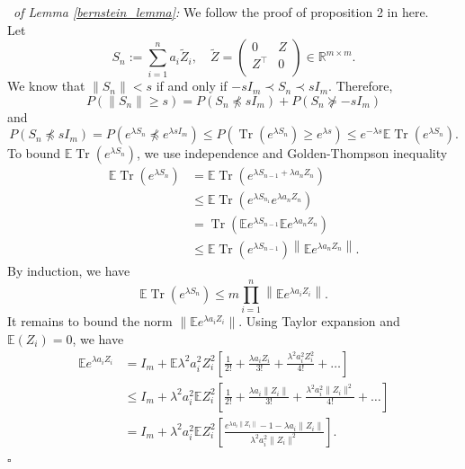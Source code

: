 \documentclass[12pt]{article}
\def\Tr{\operatorname{Tr}}
\newenvironment{pf}{{\noindent\it Proof}\ }{\hfill $\square$\par}
\begin{document}
\begin{pf}{\it of Lemma \ref{bernstein_lemma}:}
  We follow the proof of proposition 2 in \cite{koltchinskii2011neumann} here.\\
  Let 
  $$S_n := \sum_{i=1}^n a_i\widetilde{Z}_i,\quad \widetilde{Z} = \left(\begin{matrix}0&Z\\Z^\top &0\\\end{matrix}\right)\in \mathbb{R}^{m\times m}.$$
  We know that
  $\|S_n\|<s $ if and only if $-s I_{m}\prec S_n \prec s I_{m}$. Therefore, 
  \begin{equation*}
  P(\|S_n\|\ge s ) = P(S_n \not \preceq s I_{m}) +P(S_n\not  \succeq -s I_{m})
  \end{equation*}
  and
  \begin{equation*}
  P(S_n\not \preceq s I_{m}) = P\left(e^{\lambda S_n}\not \preceq e^{\lambda s I_{m}}\right)\le P\left(\Tr(e^{\lambda S_n})\ge  e^{\lambda s}\right) \le e^{-\lambda s} \mathbb{E}\Tr(e^{\lambda S_n}).
  \end{equation*}
  To bound $\mathbb{E}\Tr(e^{\lambda S_n})$, we use independence and Golden-Thompson inequality 
  \begin{equation*}
  \begin{aligned}
  \mathbb{E}\Tr(e^{\lambda S_n}) & = \mathbb{E}\Tr\left(e^{\lambda S_{n-1} + \lambda a_n Z_n}\right)\\&\le 
  \mathbb{E}\Tr\left(e^{\lambda S_{n_1}}e^{\lambda a_n Z_n}\right)\\&=
  \Tr\left(\mathbb{E}e^{\lambda S_{n-1}}\mathbb{E}e^{\lambda a_n Z_{n}}\right)\\& \le 
  \mathbb{E}\Tr\left(e^{\lambda S_{n-1}}\right)\left\|\mathbb{E}e^{\lambda a_n Z_n}\right\|.
  \end{aligned}
  \end{equation*}
  By induction, we have 
  \begin{equation*}
  \mathbb{E}\Tr(e^{\lambda S_n}) \le m\prod_{i=1}^n \left\|\mathbb{E}e^{\lambda a_i Z_i}\right\|.
  \end{equation*}
  It remains to bound the norm $\|\mathbb{E}e^{\lambda a_i Z_i}\|$. Using Taylor expansion and $\mathbb{E}(Z_i)=0$, we have
  \begin{align*}
  \mathbb{E} e^{\lambda a_i Z_i}&=I_{m}+\mathbb{E} \lambda^{2}a_i^2 Z_i^{2}\left[\frac{1}{2 !}+\frac{\lambda a_i Z_i}{3 !}+\frac{\lambda^{2}a_i^2 Z_i^{2}}{4 !}+\ldots\right] \\&\leq 
  I_{m}+\lambda^{2} a_i^2\mathbb{E} Z_i^{2}\left[\frac{1}{2 !}+\frac{\lambda a_i\|Z_i\|}{3 !}+\frac{\lambda^{2}a_i^2\|Z_i\|^{2}}{4 !}+\ldots\right]\\&=I_{m}+\lambda^{2}a_i^2 \mathbb{E} Z_i^{2}\left[\frac{e^{\lambda a_i\|Z_i\|}-1-\lambda a_i\|Z_i\|}{\lambda^{2}a_i^2\|Z_i\|^{2}}\right]. 

\end{align*}
\end{pf}
\end{document}
